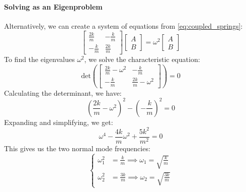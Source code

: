 \documentclass[11pt]{report}
\begin{document}
\paragraph{Solving as an Eigenproblem} Alternatively, we can create a system of equations from \eqref{eq:coupled_springs}:
\begin{equation}
    \begin{bmatrix}
        \frac{2k}{m} & -\frac{k}{m} \\
        -\frac{k}{m} & \frac{2k}{m}
    \end{bmatrix}
    \begin{bmatrix}
        A \\ B
    \end{bmatrix}
    = \omega^2
    \begin{bmatrix}
        A \\ B
    \end{bmatrix}
\end{equation}
To find the eigenvalues \( \omega^2 \), we solve the characteristic equation:
$$
    \text{det}\left(\begin{bmatrix}
        \frac{2k}{m} - \omega^2 & -\frac{k}{m} \\
        -\frac{k}{m} & \frac{2k}{m} - \omega^2
    \end{bmatrix}\right) = 0
$$
Calculating the determinant, we have:
$$
    \left(\frac{2k}{m} - \omega^2\right)^2 - \left(-\frac{k}{m}\right)^2 = 0
$$
Expanding and simplifying, we get:
$$
    \omega^4 - \frac{4k}{m}\omega^2 + \frac{5k^2}{m^2} = 0
$$
This gives us the two normal mode frequencies:
\begin{equation}
    \begin{cases}
        \omega_1^2 &= \frac{k}{m} \implies \omega_1 = \sqrt{\frac{k}{m}} \\
        \omega_2^2 &= \frac{3k}{m} \implies \omega_2 = \sqrt{\frac{3k}{m}}
    \end{cases}
\end{equation}
\end{document}
